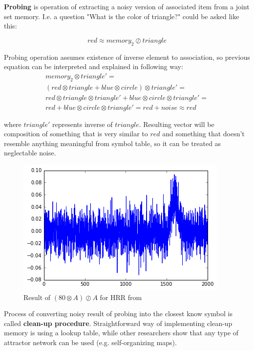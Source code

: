 \documentclass[conference]{IEEEtran}
\begin{document}
	\textbf{Probing} is operation of extracting a noisy version of associated item from a joint set memory.
I.e. a question "What is the color of triangle?" could be asked like this:
	
	\begin{equation}
	red \approx memory_2 \oslash triangle
	\end{equation}
	
	Probing operation assumes existence of inverse element to association, so previous equation can be interpreted and explained in following way:
	\begin{multline}
	memory_2 \otimes triangle'=\\
	(red \otimes triangle + blue \otimes circle) \otimes triangle'=\\
	red \otimes triangle  \otimes triangle' + blue \otimes circle \otimes triangle' =\\
	red + blue \otimes circle \otimes triangle'  = red + noise
	\approx red
	\end{multline}
	
	where $triangle'$ represents inverse of $triangle$.
Resulting vector will be composition of something that is very similar to $red$ and something that doesn't resemble anything meaningful from symbol table, so it can be treated as neglectable noise.
	
	\begin{figure}
		\center
		\includegraphics[width=0.9\columnwidth]{img/scalar-probe.png}
		\caption{Result of $(80 \otimes A) \oslash A$ for HRR from}
	\end{figure}
	
	Process of converting noisy result of probing into the closest know symbol is called \textbf{clean-up procedure}.
Straightforward way of implementing clean-up memory is using a lookup table, while other researchers show that any type of attractor network can be used (e.g. self-organizing maps).
	
\end{document}
